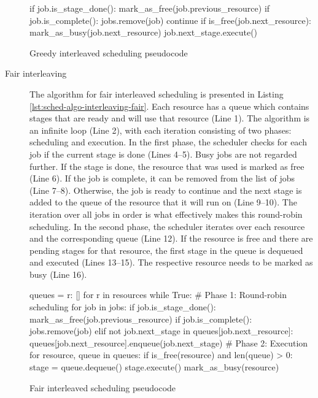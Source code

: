 \begin{description}
\begin{listing}[h]
\begin{pythoncode}
    if job.is_stage_done():
        mark_as_free(job.previous_resource)
        if job.is_complete():
            jobs.remove(job)
            continue
        if is_free(job.next_resource):
           mark_as_busy(job.next_resource)
           job.next_stage.execute()
\end{pythoncode}
\unskip
\caption{Greedy interleaved scheduling pseudocode}
\label{lst:sched-algo-interleaving-greedy}
\end{listing}
	\item[Fair interleaving] The algorithm for fair interleaved scheduling is presented in Listing \ref{lst:sched-algo-interleaving-fair}. Each resource has a queue which contains stages that are ready and will use that resource (Line 1). The algorithm is an infinite loop (Line 2), with each iteration consisting of two phases: scheduling and execution. In the first phase, the scheduler checks for each job if the current stage is done (Lines 4--5). Busy jobs are not regarded further. If the stage is done, the resource that was used is marked as free (Line 6). If the job is complete, it can be removed from the list of jobs (Line 7--8). Otherwise, the job is ready to continue and the next stage is added to the queue of the resource that it will run on (Line 9--10). The iteration over all jobs in order is what effectively makes this round-robin scheduling. In the second phase, the scheduler iterates over each resource and the corresponding queue (Line 12). If the resource is free and there are pending stages for that resource, the first stage in the queue is dequeued and executed (Lines 13--15). The respective resource needs to be marked as busy (Line 16).
\begin{listing}[h]
\begin{pythoncode}
queues = {r: [] for r in resources}
while True:
 # Phase 1: Round-robin scheduling
 for job in jobs:
     if job.is_stage_done():
         mark_as_free(job.previous_resource)
         if job.is_complete():
             jobs.remove(job)
         elif not job.next_stage in queues[job.next_resource]:
             queues[job.next_resource].enqueue(job.next_stage)
 # Phase 2: Execution
 for resource, queue in queues:
     if is_free(resource) and len(queue) > 0:
         stage = queue.dequeue()
         stage.execute()
         mark_as_busy(resource)
\end{pythoncode}
\unskip
\caption{Fair interleaved scheduling pseudocode}
\label{lst:sched-algo-interleaving-fair}
\end{listing}
\end{description}


